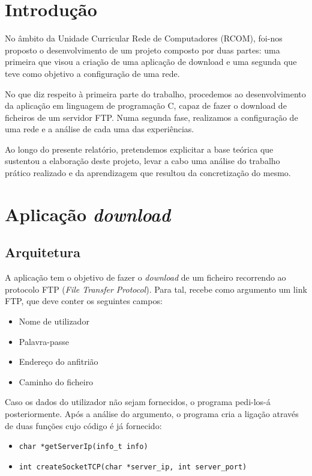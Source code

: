 \documentclass{article}
\begin{document}
\tableofcontents
\clearpage
 
\section{Introdução}
No âmbito da Unidade Curricular Rede de Computadores (RCOM), foi-nos proposto o desenvolvimento de um projeto composto por duas partes: uma primeira que visou a criação de uma aplicação de download e uma segunda que teve como objetivo a configuração de uma rede.  

No que diz respeito à primeira parte do trabalho, procedemos ao desenvolvimento da aplicação em linguagem de programação C, capaz de fazer o download de ficheiros de um servidor FTP. Numa segunda fase, realizamos a configuração de uma rede e a análise de cada uma das experiências.  

Ao longo do presente relatório, pretendemos explicitar a base teórica que sustentou a elaboração deste projeto, levar a cabo uma análise do trabalho prático realizado e da aprendizagem que resultou da concretização do mesmo. 

\section{Aplicação \textit{download}}
\subsection{Arquitetura}

A aplicação tem o objetivo de fazer o \textit{download} de um ficheiro recorrendo ao protocolo
FTP (\textit{File Transfer Protocol}). Para tal, recebe como argumento um link FTP, que deve conter
os seguintes campos:

\begin{itemize}
\item Nome de utilizador
\item Palavra-passe
\item Endereço do anfitrião
\item Caminho do ficheiro
\end{itemize}

Caso os dados do utilizador não sejam fornecidos, o programa pedi-los-á posteriormente.
Após a análise do argumento, o programa cria a ligação através de duas funções cujo código 
é já fornecido:

\begin{itemize}
\item \texttt{char *getServerIp(info_t info)}
\item \texttt{int createSocketTCP(char *server_ip, int server_port)}
\end{itemize}
\end{document}
